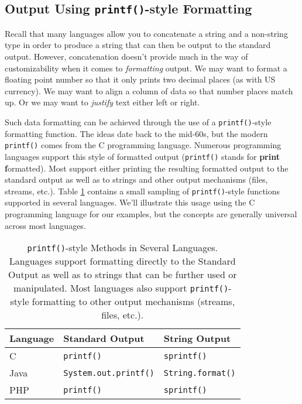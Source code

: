 \subsection{Output Using \texttt{printf()}-style Formatting}
\label{subsection:printfStyleFormatting}

Recall that many languages allow you to concatenate a string and a 
non-string type in order to produce a string that can then be output 
to the standard output.  However, concatenation doesn't provide much 
in the way of customizability when it comes
to \emph{formatting} output.  We may want to format a 
floating point number so
that it only prints two decimal places (as with US currency).  We may want
to align a column of data so that number places match up.  Or we may want
to \emph{justify} text either left or right.

Such data formatting can be achieved through the use of a \texttt{printf()}-style
formatting function.  The ideas date back to the mid-60s, but the modern \texttt{printf()}
comes from the C programming language.  Numerous programming languages support
this style of formatted output (\texttt{printf()} stands for \textbf{print} \textbf{f}ormatted).
Most support either printing the resulting formatted output to the standard output as well as
to strings and other output mechanisms (files, streams, etc.).  Table \ref{table:printfSupport}
contains a small sampling of \texttt{printf()}-style functions 
supported in several languages.
We'll illustrate this usage using the C programming language for our examples, but the 
concepts are generally universal across most languages.

\begin{table}
\centering
\begin{tabular}{l|l|l}
Language & Standard Output & String Output \\
\hline\hline
C & \texttt{printf()} &  \texttt{sprintf()} \\
Java & \texttt{System.out.printf()} & \texttt{String.format()} \\
PHP & \texttt{printf()} & \texttt{sprintf()} \\
\end{tabular}
\caption[\texttt{printf()}-style Methods in Several Languages]{\texttt{printf()}-style Methods in Several Languages.  
Languages support formatting directly to the Standard Output as well as to strings that can be further used or manipulated.
Most languages also support \texttt{printf()}-style formatting to other output mechanisms (streams, files, etc.).}
\label{table:printfSupport}
\end{table}

